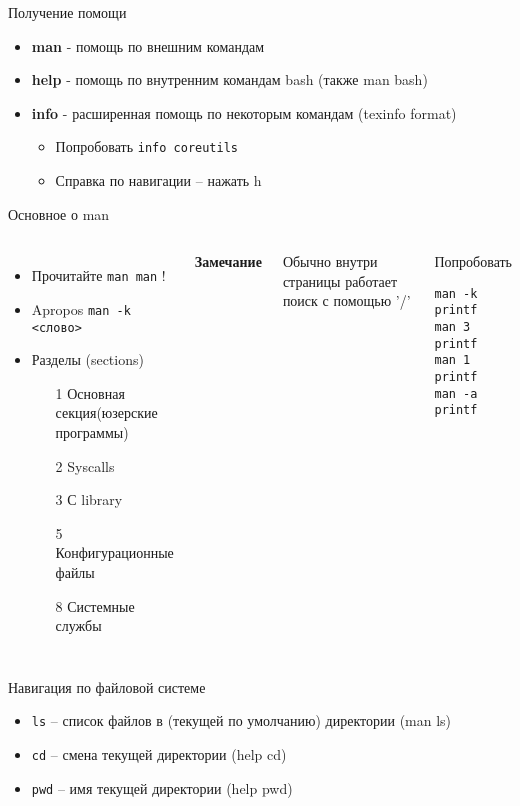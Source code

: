 \begin{frame}[fragile]{Получение помощи}
  \begin{itemize}
    \pause
    \item \textbf{man} - помощь по внешним командам
    \pause
    \item \textbf{help} - помощь по внутренним командам bash (также man bash)
    \pause
    \item \textbf{info} - расширенная помощь по некоторым командам (texinfo format)
      \begin{itemize}
       \item   Попробовать {\tt info coreutils}
       \item   Справка по навигации -- нажать h
      \end{itemize}
  \end{itemize}
\end{frame}
\begin{frame}[fragile]{Основное о man}
\begin{columns}
  \column{2.2in}
  \begin{itemize}
        \item Прочитайте {\tt man man} !
        \item Apropos {\tt man -k <слово>}
        \item Разделы (sections)
          \begin{itemize}
            \item[1] Основная секция(юзерские программы) 
            \item[2] Syscalls
            \item[3] С library
            \item[5] Конфигурационные файлы
            \item[8] Системные службы
          \end{itemize}
  \end{itemize}
  \textbf{Замечание}

  Обычно внутри страницы работает поиск с помощью '/'
 \pause 
 \column{1in}
 \begin{block}{Попробовать}
\begin{lstlisting}
man -k printf
man 3 printf
man 1 printf
man -a printf
\end{lstlisting}
\end{block}
\end{columns}
\end{frame}
\begin{frame}{Навигация по файловой системе}
      \begin{itemize}
		  \item {\tt ls} -- список файлов в (текущей по умолчанию) директории (man ls)
		  \item {\tt cd} -- смена текущей директории (help cd)
		  \item {\tt pwd} -- имя текущей директории (help pwd)
      \end{itemize}
\end{frame}

